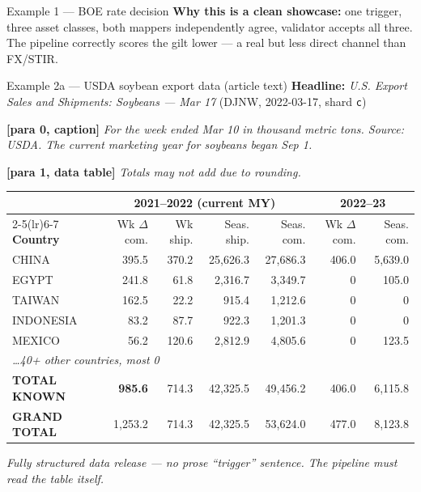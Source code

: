 \documentclass[10pt,aspectratio=169]{beamer}
\begin{document}
\begin{frame}[fragile]{Example 1 --- BOE rate decision}
  \vspace{0.4em}
  \textcolor{goodgreen}{\textbf{Why this is a clean showcase:}} one trigger, three asset classes,
  both mappers independently agree, validator accepts all three. The pipeline correctly
  scores the gilt lower --- a real but less direct channel than FX/STIR.
\end{frame}

\begin{frame}[fragile]{Example 2a --- USDA soybean export data (article text)}
  \scriptsize
  \textbf{Headline:} \emph{U.S. Export Sales and Shipments: Soybeans --- Mar 17}
  \hfill (DJNW, 2022-03-17, shard \texttt{c})

  \vspace{0.3em}
  \textbf{[para 0, caption]} \emph{For the week ended Mar 10 in thousand metric tons.
  Source: USDA. The current marketing year for soybeans began Sep 1.}

  \vspace{0.2em}
  \textbf{[para 1, data table]} \emph{Totals may not add due to rounding.}

  \vspace{0.2em}
  \centering
  \setlength{\tabcolsep}{4pt}
  \renewcommand{\arraystretch}{1.0}
  \begin{tabular}{lrrrrrr}
    \toprule
     & \multicolumn{4}{c}{\textbf{2021--2022 (current MY)}} & \multicolumn{2}{c}{\textbf{2022--23}} \\
    \cmidrule(lr){2-5}\cmidrule(lr){6-7}
    \textbf{Country} & Wk $\Delta$ com. & Wk ship. & Seas. ship. & Seas. com. & Wk $\Delta$ com. & Seas. com. \\
    \midrule
    CHINA        & 395.5 & 370.2 & 25{,}626.3 & 27{,}686.3 & 406.0 & 5{,}639.0 \\
    EGYPT        & 241.8 &  61.8 &  2{,}316.7 &  3{,}349.7 &     0 &   105.0 \\
    TAIWAN       & 162.5 &  22.2 &     915.4 &  1{,}212.6 &     0 &       0 \\
    INDONESIA    &  83.2 &  87.7 &     922.3 &  1{,}201.3 &     0 &       0 \\
    MEXICO       &  56.2 & 120.6 &  2{,}812.9 &  4{,}805.6 &     0 &   123.5 \\
    \multicolumn{7}{l}{\emph{\ldots 40+ other countries, most 0}} \\
    \midrule
    \textbf{TOTAL KNOWN} & \textbf{985.6} & 714.3 & 42{,}325.5 & 49{,}456.2 & 406.0 & 6{,}115.8 \\
    \textbf{GRAND TOTAL} & 1{,}253.2 & 714.3 & 42{,}325.5 & 53{,}624.0 & 477.0 & 8{,}123.8 \\
    \bottomrule
  \end{tabular}

  \vspace{0.3em}
  \raggedright\footnotesize
  \emph{Fully structured data release --- no prose ``trigger'' sentence. The pipeline must read
  the table itself.}
\end{frame}
\end{document}
